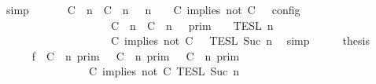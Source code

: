 \begin{isabellebody}
\ simp\isanewline
\ \ \isamarkupfalse%
\ \isamarkupfalse%
\ {\isacartoucheopen}{\isasymlbrakk}\ {\isacharparenleft}{\isacharparenleft}C\ {\isasymUp}\ n{\isacharparenright}\ {\isacharhash}\ {\isacharparenleft}C\ {\isasymnot}{\isasymUp}\ n{\isacharparenright}\ {\isacharhash}\ {\isasymGamma}{\isacharparenright}{\isacharcomma}\ n\ {\isasymTurnstile}\ {\isasymPsi}\ {\isasymtriangleright}\ {\isacharparenleft}{\isacharparenleft}C\ implies\ not\ C\ {\isacharhash}\ {\isasymPhi}{\isacharparenright}\ {\isasymrbrakk}\isactrlsub c\isactrlsub o\isactrlsub n\isactrlsub f\isactrlsub i\isactrlsub g\isanewline
\ \ \ \ \ \ \ \ \ \ \ \ \ \ \ \ \ \ {\isacharequal}\ {\isasymlbrakk}{\isasymlbrakk}\ {\isacharparenleft}{\isacharparenleft}C\ {\isasymUp}\ n{\isacharparenright}\ {\isacharhash}\ {\isacharparenleft}C\ {\isasymnot}{\isasymUp}\ n{\isacharparenright}\ {\isacharhash}\ {\isasymGamma}{\isacharparenright}\ {\isasymrbrakk}{\isasymrbrakk}\isactrlsub p\isactrlsub r\isactrlsub i\isactrlsub m\ {\isasyminter}\ {\isasymlbrakk}{\isasymlbrakk}\ {\isasymPsi}\ {\isasymrbrakk}{\isasymrbrakk}\isactrlsub T\isactrlsub E\isactrlsub S\isactrlsub L\isactrlbsup {\isasymge}\ n\isactrlesup \isanewline
\ \ \ \ \ \ \ \ \ \ \ \ \ \ \ \ \ \ {\isasyminter}\ {\isasymlbrakk}{\isasymlbrakk}\ {\isacharparenleft}C\ implies\ not\ C\ {\isacharhash}\ {\isasymPhi}\ {\isasymrbrakk}{\isasymrbrakk}\isactrlsub T\isactrlsub E\isactrlsub S\isactrlsub L\isactrlbsup {\isasymge}\ Suc\ n\isactrlesup {\isacartoucheclose}\ \isamarkupfalse%
\ simp\isanewline
\ \ \isamarkupfalse%
\ \isamarkupfalse%
\ {\isacharquery}thesis\isanewline
\ \ \isamarkupfalse%
\ {\isacharminus}\isanewline
\ \ \ \ \isamarkupfalse%
\ f{}{\isacharcolon}\ {\isacartoucheopen}{\isacharparenleft}{\isasymlbrakk}\ C\ {\isasymnot}{\isasymUp}\ n\ {\isasymrbrakk}\isactrlsub p\isactrlsub r\isactrlsub i\isactrlsub m\ {\isasymunion}\ {\isasymlbrakk}\ C\ {\isasymUp}\ n\ {\isasymrbrakk}\isactrlsub p\isactrlsub r\isactrlsub i\isactrlsub m\ {\isasyminter}\ {\isasymlbrakk}\ C\ {\isasymnot}{\isasymUp}\ n\ {\isasymrbrakk}\isactrlsub p\isactrlsub r\isactrlsub i\isactrlsub m{\isacharparenright}\isanewline
\ \ \ \ \ \ \ \ \ \ \ \ \ \ {\isasyminter}\ {\isasymlbrakk}\ C\ implies\ not\ C\ {\isasymrbrakk}\isactrlsub T\isactrlsub E\isactrlsub S\isactrlsub L\isactrlbsup {\isasymge}\ Suc\ n\isactrlesup \isanewline

\end{isabellebody}

